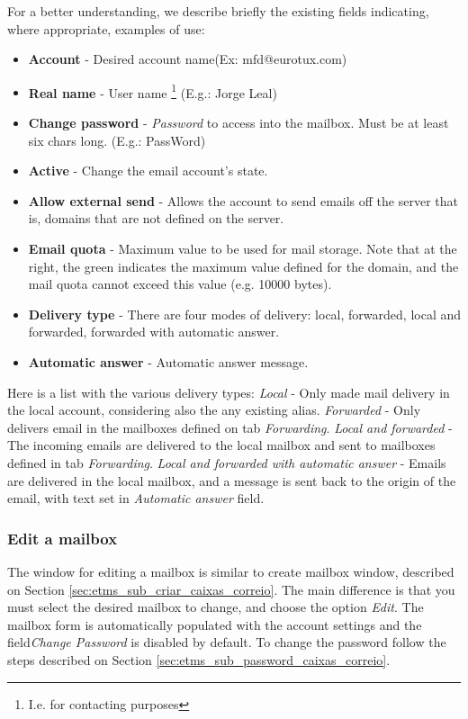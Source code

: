 For a better understanding, we describe briefly the existing fields indicating, where appropriate, examples of use:

\begin{itemize}
\item \textbf{Account} - Desired account name(Ex: mfd@eurotux.com)
\item \textbf{Real name} - User name \footnote{I.e. for contacting purposes} (E.g.: Jorge Leal)
\item \textbf{Change password} - \textit{Password} to access into the mailbox. Must be at least six chars long. (E.g.: PassWord)
\item \textbf{Active} - Change the email account's state.
\item \textbf{Allow external send} - Allows the account to send emails off the server that is, domains that are not defined on the server.
\item \textbf{Email quota} - Maximum value to be used for mail storage. Note that at the right, the green indicates the maximum value defined for the domain, and the mail quota cannot exceed this value (e.g. 10000 bytes).
\item \textbf{Delivery type} - There are four modes of delivery: local, forwarded, local and forwarded, forwarded with automatic answer.
\item \textbf{Automatic answer} - Automatic answer message.
\end{itemize}

Here is a list with the various delivery types:
\textit{Local} - Only made mail delivery in the local account, considering also the any existing alias.
\textit{Forwarded} - Only delivers email in the mailboxes defined on tab \textit{Forwarding}.
\textit{Local and forwarded} - The incoming emails are delivered to the local mailbox and sent to mailboxes defined in tab \textit{Forwarding}.
\textit{Local and forwarded with automatic answer} - Emails are delivered in the local mailbox, and a message is sent back to the origin of the email, with text set in \textit{Automatic answer} field.

\subsubsection{Edit a mailbox}
\label{sec:etms_sub_editar_caixas_correio}
The window for editing a mailbox is similar to create mailbox window, described on Section \ref{sec:etms_sub_criar_caixas_correio}. The main difference is that you must select the desired mailbox to change, and choose the option \textit{Edit}. The mailbox form is automatically populated with the account settings and the field\textit {Change Password} is disabled by default. To change the password follow the steps described on Section \ref{sec:etms_sub_password_caixas_correio}.


